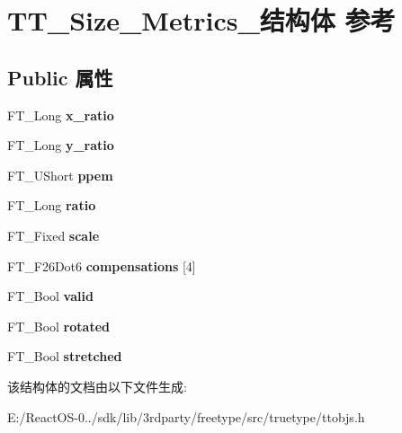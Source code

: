 \hypertarget{struct_t_t___size___metrics__}{}\section{T\+T\+\_\+\+Size\+\_\+\+Metrics\+\_\+结构体 参考}
\label{struct_t_t___size___metrics__}
\subsection*{Public 属性}
\begin{DoxyCompactItemize}
\item 
\mbox{\label{struct_t_t___size___metrics___afe2abe53854d81fc690d8076663aa014}} 
F\+T\+\_\+\+Long {\bfseries x\+\_\+ratio}
\item 
\mbox{\label{struct_t_t___size___metrics___ab1746b4c39fbe9750e1a0c6fd5b0df04}} 
F\+T\+\_\+\+Long {\bfseries y\+\_\+ratio}
\item 
\mbox{\label{struct_t_t___size___metrics___aeb81d06460f0a8b95c8b4d53e5e73fcc}} 
F\+T\+\_\+\+U\+Short {\bfseries ppem}
\item 
\mbox{\label{struct_t_t___size___metrics___abd4b03cbbf2ba09884bd8109a968f93f}} 
F\+T\+\_\+\+Long {\bfseries ratio}
\item 
\mbox{\label{struct_t_t___size___metrics___ac13aee69211ee82fe67eb5e828125b30}} 
F\+T\+\_\+\+Fixed {\bfseries scale}
\item 
\mbox{\label{struct_t_t___size___metrics___a7f8d48f9516608eb13b811efd5ad99bb}} 
F\+T\+\_\+\+F26\+Dot6 {\bfseries compensations} \mbox{[}4\mbox{]}
\item 
\mbox{\label{struct_t_t___size___metrics___a33578f5791bd8452d95f92aff1de4bde}} 
F\+T\+\_\+\+Bool {\bfseries valid}
\item 
\mbox{\label{struct_t_t___size___metrics___a1ec91582495e1314e1e7b6bb118600a9}} 
F\+T\+\_\+\+Bool {\bfseries rotated}
\item 
\mbox{\label{struct_t_t___size___metrics___a9b25bf7f7538b9c71b06d382202fa392}} 
F\+T\+\_\+\+Bool {\bfseries stretched}
\end{DoxyCompactItemize}


该结构体的文档由以下文件生成\+:\begin{DoxyCompactItemize}
\item 
E\+:/\+React\+O\+S-\/0../sdk/lib/3rdparty/freetype/src/truetype/ttobjs.\+h\end{DoxyCompactItemize}

